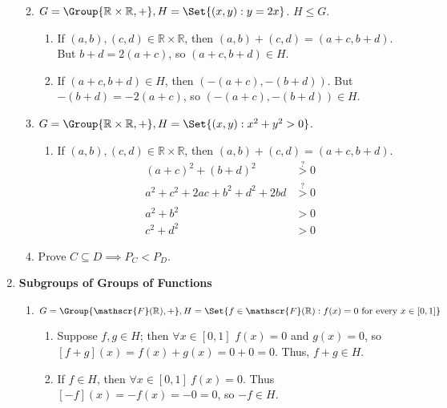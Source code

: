 \begin{enumerate}[label={\Alph*.},font={\bfseries}]
\begin{enumerate}[label={\arabic*},font={\bfseries}]
\begin{enumerate}[label={(\roman*)}]
    \end{enumerate}
  \item $G = \Group{\mathbb{R} \times \mathbb{R}, +}, H = \Set{(x,y) : y = 2x}$.
    $H \le G$.
    \begin{enumerate}[label={(\roman*)}]
    \item If $(a,b), (c,d) \in \mathbb{R} \times \mathbb{R}$, then $(a,b) + (c,d) = (a+c,b+d)$.
      But $b+d = 2(a+c)$, so $(a+c,b+d) \in H$.
    \item If $(a+c,b+d) \in H$, then $(-(a+c),-(b+d))$. But $-(b+d) = -2(a+c)$, so $(-(a+c),-(b+d)) \in H$.
    \end{enumerate}
  \item $G = \Group{\mathbb{R} \times \mathbb{R}, +}, H = \Set{(x,y) : x^2 + y^2 > 0}$.
    \begin{enumerate}[label={(\roman*)}]
    \item If $(a,b), (c,d) \in \mathbb{R} \times \mathbb{R}$, then $(a,b) + (c,d) = (a+c,b+d)$.
      \begin{align*}
        (a+c)^2 + (b+d)^2 &\overset{?}{>} 0 \\
        a^2 + c^2 + 2ac + b^2 + d^2 + 2bd &\overset{?}{>} 0 \\
        \\
        a^2 + b^2 &> 0 \\
        c^2 + d^2 &> 0
      \end{align*}
    \end{enumerate}
  \item Prove $C \subseteq D \implies P_C < P_D$.
  \end{enumerate}
\item {\bf Subgroups of Groups of Functions}
  \begin{enumerate}[label={\arabic*},font={\bfseries}]
  \item $G = \Group{\mathscr{F}(\mathbb{R}), +}, H = \Set{f \in \mathscr{F}(\mathbb{R}) : f(x) = 0\ \text{for every}\ x \in [0,1]}$
    \begin{enumerate}[label={(\roman*)}]
    \item Suppose $f,g \in H$; then $\forall x \in [0,1]$ $f(x) = 0$ and $g(x) = 0$, so $[f+g](x) = f(x) + g(x) = 0 + 0 = 0$. Thus, $f + g \in H$.
    \item If $f \in H$, then $\forall x \in [0,1]\ f(x) = 0$. Thus $[-f](x) = -f(x) = -0 = 0$, so $-f \in H$.
    \end{enumerate}

\end{enumerate}
\end{enumerate}
